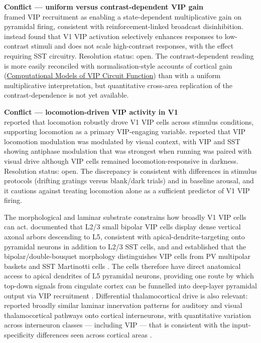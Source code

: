 \documentclass[11pt]{article}
\begin{document}
\begin{framed}
\textbf{Conflict --- uniform versus contrast-dependent VIP gain}\\
\citet{Pi2013} framed VIP recruitment as enabling a state-dependent multiplicative gain on pyramidal firing, consistent with reinforcement-linked broadcast disinhibition. \citet{Millman2020} instead found that V1 VIP activation selectively enhances responses to low-contrast stimuli and does not scale high-contrast responses, with the effect requiring SST circuitry. Resolution status: open. The contrast-dependent reading is more easily reconciled with normalisation-style accounts of cortical gain (\href{/computational-models}{Computational Models of VIP Circuit Function}) than with a uniform multiplicative interpretation, but quantitative cross-area replication of the contrast-dependence is not yet available.
\end{framed}

\begin{framed}
\textbf{Conflict --- locomotion-driven VIP activity in V1}\\
\citet{Dipoppa2018} reported that locomotion robustly drove V1 VIP cells across stimulus conditions, supporting locomotion as a primary VIP-engaging variable. \citet{Pakan2016} reported that VIP locomotion modulation was modulated by visual context, with VIP and SST showing antiphase modulation that was strongest when running was paired with visual drive although VIP cells remained locomotion-responsive in darkness. Resolution status: open. The discrepancy is consistent with differences in stimulus protocols (drifting gratings versus blank/dark trials) and in baseline arousal, and it cautions against treating locomotion alone as a sufficient predictor of V1 VIP firing.
\end{framed}

The morphological and laminar substrate constrains how broadly V1 VIP cells can act. \citet{Gonchar2008} documented that L2/3 small bipolar VIP cells display dense vertical axonal arbors descending to L5, consistent with apical-dendrite-targeting onto pyramidal neurons in addition to L2/3 SST cells, and \citet{Kawaguchi1996} and \citet{Kawaguchi1997a} established that the bipolar/double-bouquet morphology distinguishes VIP cells from PV multipolar baskets and SST Martinotti cells \citep{Kawaguchi1996, Kawaguchi1997a, Gonchar2008}. The cells therefore have direct anatomical access to apical dendrites of L5 pyramidal neurons, providing one route by which top-down signals from cingulate cortex can be funnelled into deep-layer pyramidal output via VIP recruitment \citep{Bastos2023a, Wall2016}. Differential thalamocortical drive is also relevant: \citet{Ji2016} reported broadly similar laminar innervation patterns for auditory and visual thalamocortical pathways onto cortical interneurons, with quantitative variation across interneuron classes --- including VIP --- that is consistent with the input-specificity differences seen across cortical areas \citep{Wall2016, Sermet2019}.
\end{document}
